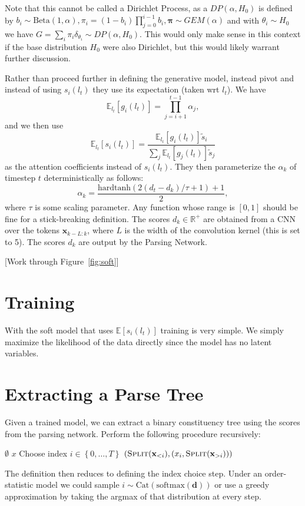 \documentclass{article}
\newcommand\set[1]{\left\{#1\right\}}
\newcommand{\Cat}{\mathrm{Cat}}
\newcommand\Betad{\mathrm{Beta}}
\newcommand\E[1]{\mathbb{E}\left[#1\right]}
\newcommand\Es[2]{\mathbb{E}_{#1}\left[#2\right]}
\newcommand{\bd}{\mathbf{d}}
\newcommand{\bx}{\mathbf{x}}
\begin{document}
Note that this cannot be called a Dirichlet Process, as a $DP(\alpha, H_0)$ is defined by
$b_i\sim\Betad(1,\alpha),\pi_i=(1-b_i)\prod_{j=0}^{i-1}b_i,\bm{\pi}\sim GEM(\alpha)$
and with $\theta_i\sim H_0$ we have $G = \sum_i\pi_i\delta_{\theta_i}\sim DP(\alpha, H_0)$.
This would only make sense in this context if the base distribution $H_0$ were also Dirichlet,
but this would likely warrant further discussion.

Rather than proceed further in defining the generative model,
\citet{shen2018prpn} instead pivot and instead of using $s_i(l_t)$
they use its expectation (taken wrt $l_t$).
We have
\begin{equation}
\Es{l_t}{g_i(l_t)} = \prod_{j=i+1}^{t-1}\alpha_j,
\end{equation}
and we then use
\begin{equation}
\Es{l_t}{s_i(l_t)} = \frac{\Es{l_t}{g_i(l_t)}\tilde{s}_i}{\sum_j\Es{l_t}{g_j(l_t)}\tilde{s}_j}
\end{equation}
as the attention coefficients instead of $s_i(l_t)$.
They then parameterize the $\alpha_k$ of timestep $t$ deterministically as follows:
\begin{equation}
\alpha_k = \frac{\textrm{hardtanh}(2(d_t-d_k)/\tau+1)+1}{2},
\end{equation}
where $\tau$ is some scaling parameter.
Any function whose range is $[0,1]$ should be fine for a stick-breaking definition.
The scores $d_k\in\mathbb{R}^+$ are obtained from a CNN over the tokens $\bx_{k-L:k}$,
where $L$ is the width of the convolution kernel (this is set to 5).
The scores $d_k$ are output by the Parsing Network.

[Work through Figure~\ref{fig:soft}]

\section{Training}
With the soft model that uses $\E{s_i(l_t)}$ training is very simple.
We simply maximize the likelihood of the data directly since the model has no latent variables.

\section{Extracting a Parse Tree}
Given a trained model, we can extract a binary constituency tree using the scores from the parsing network.
Perform the following procedure recursively:
\begin{algorithmic}
\Function{Split}{$x = \set{x_0,\ldots,x_T}$}
\State \Return $\emptyset$
\State \Return $x$
\Else
\State Choose index $i\in\set{0,\ldots,T}$ 
\State \Return $(\Call{Split}{\bx_{<i}}, (x_i, \Call{Split}{\bx_{>i}}))$
\EndIf
\EndFunction
\end{algorithmic}
The definition then reduces to defining the index choice step.
Under an order-statistic model we could sample $i\sim\Cat(\textrm{softmax}(\bd))$
or use a greedy approximation by taking the argmax of that distribution at every step.
\end{document}
